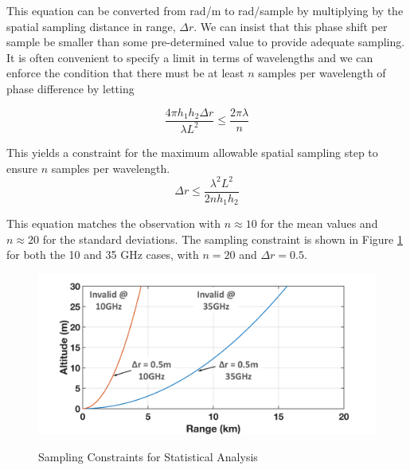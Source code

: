 \noindent This equation can be converted from rad/m to rad/sample by multiplying by the spatial sampling distance in range, $\Delta r$. We can insist that this phase shift per sample be smaller than some pre-determined value to provide adequate sampling. It is often convenient to specify a limit in terms of wavelengths and we can enforce the condition that there must be at least $n$ samples per wavelength of phase difference by letting

\begin{equation}
\frac{4\pi h_1h_2\Delta r}{\lambda L^2} \leq \frac{2\pi \lambda}{n}
\label{stat_eq:3}
\end{equation}

This yields a constraint for the maximum allowable spatial sampling step to ensure $n$ samples per wavelength.
\begin{equation}
\boxed{\Delta r \leq \frac{\lambda^2 L^2}{2nh_1h_2}}
\label{stat_eq:4}
\end{equation}

This equation matches the observation with $n\approx 10$ for the mean values and $n\approx 20$ for the standard deviations. The sampling constraint is shown in Figure \ref{stat_fig:3} for both the 10 and 35 GHz cases, with $n = 20$ and $\Delta r = 0.5$.

\begin{figure}[H]
  \begin{center}
\includegraphics[width=5in]{../media/statistics/sampling_constraint.png}
  \end{center}
  \renewcommand{\baselinestretch}{1} \small\normalsize
  \begin{quote}
    \caption[Sampling Constraints for Statistical Analysis]{Sampling Constraints for Statistical Analysis\label{stat_fig:3}}
  \end{quote}
\end{figure}
\renewcommand{\baselinestretch}{2} \small\normalsize


